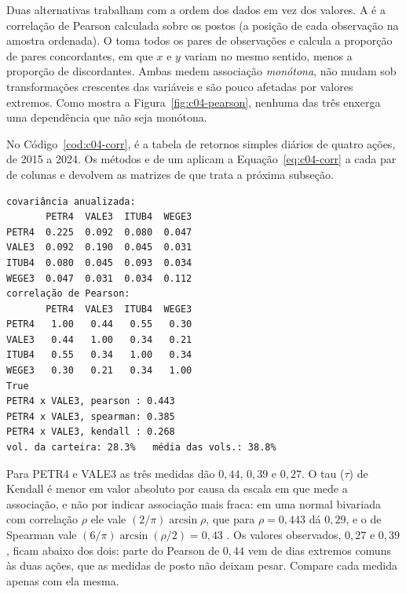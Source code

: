Duas alternativas trabalham com a ordem dos dados em vez dos valores. A  é a correlação de Pearson calculada sobre os postos (a posição de cada observação na amostra ordenada). O  toma todos os pares de observações e calcula a proporção de pares concordantes, em que $x$ e $y$ variam no mesmo sentido, menos a proporção de discordantes. Ambas medem associação \emph{monótona}, não mudam sob transformações crescentes das variáveis e são pouco afetadas por valores extremos. Como mostra a Figura~\ref{fig:c04-pearson}, nenhuma das três enxerga uma dependência que não seja monótona.

No Código~\ref{cod:c04-corr},  é a tabela de retornos simples diários de quatro ações, de 2015 a 2024. Os métodos  e  de um  aplicam a Equação~\eqref{eq:c04-corr} a cada par de colunas e devolvem as matrizes de que trata a próxima subseção.


\enlargethispage{1.5\baselineskip}
\begin{lstlisting}[style=saida]
covariância anualizada:
       PETR4  VALE3  ITUB4  WEGE3
PETR4  0.225  0.092  0.080  0.047
VALE3  0.092  0.190  0.045  0.031
ITUB4  0.080  0.045  0.093  0.034
WEGE3  0.047  0.031  0.034  0.112
correlação de Pearson:
       PETR4  VALE3  ITUB4  WEGE3
PETR4   1.00   0.44   0.55   0.30
VALE3   0.44   1.00   0.34   0.21
ITUB4   0.55   0.34   1.00   0.34
WEGE3   0.30   0.21   0.34   1.00
True
PETR4 x VALE3, pearson : 0.443
PETR4 x VALE3, spearman: 0.385
PETR4 x VALE3, kendall : 0.268
vol. da carteira: 28.3%   média das vols.: 38.8%
\end{lstlisting}

Para PETR4 e VALE3 as três medidas dão $0,44$, $0,39$ e $0,27$. O tau ($\tau$) de Kendall é menor em valor absoluto por causa da escala em que mede a associação, e não por indicar associação mais fraca: em uma normal bivariada com correlação $\rho$ ele vale $(2/\pi)\arcsin\rho$, que para $\rho = 0,443$ dá $0,29$, e o de Spearman vale $(6/\pi)\arcsin(\rho/2) = 0,43$ \citep{mcneil2015}. Os valores observados, $0,27$ e $0,39$, ficam abaixo dos dois: parte do Pearson de $0,44$ vem de dias extremos comuns às duas ações, que as medidas de posto não deixam pesar. Compare cada medida apenas com ela mesma.

